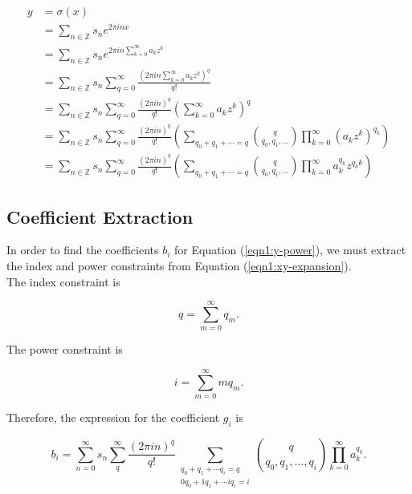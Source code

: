 \documentclass{article}
\begin{document}
    \begin{align}
        y &= \sigma(x) \nonumber \\
          &= \sum_{n\in\mathbb{Z}} s_n e^{2\pi inx} \nonumber \\
          &= \sum_{n\in\mathbb{Z}} s_n e^{2\pi in\sum_{k=0}^{\infty} a_k z^k} \nonumber \\
          &= \sum_{n\in\mathbb{Z}} s_n \sum_{q=0}^{\infty} \frac{\left(2\pi in\sum_{k=0}^{\infty} a_k z^k\right)^q}{q!} \nonumber \\
          &= \sum_{n\in\mathbb{Z}} s_n \sum_{q=0}^{\infty} \frac{(2\pi in)^q}{q!} \left(\sum_{k=0}^{\infty}a_k z^k\right)^q \nonumber \\
          &= \sum_{n\in\mathbb{Z}} s_n \sum_{q=0}^{\infty} \frac{(2\pi in)^q}{q!} \left(\sum_{q_0 + q_1 + \cdots = q} \binom{q}{q_0, q_1, \ldots} \prod_{k=0}^{\infty} \left(a_k z^k\right)^{q_k} \right) \nonumber \\
          &= \sum_{n\in\mathbb{Z}} s_n \sum_{q=0}^{\infty} \frac{(2\pi in)^q}{q!} \left(\sum_{q_0 + q_1 + \cdots = q} \binom{q}{q_0, q_1, \ldots} \prod_{k=0}^{\infty} a_k^{q_k} z^{q_k k} \right)
          \label{eqn1:xy-expansion}
    \end{align}
    
    \subsection{Coefficient Extraction}
    
    In order to find the coefficients $b_i$ for Equation (\ref{eqn1:y-power}), we must extract the index and power constraints from Equation (\ref{eqn1:xy-expansion}).\\
    
    The index constraint is
    
    \begin{equation}
        q = \sum_{m=0}^{\infty} q_m.
    \end{equation}
    
    The power constraint is
    
    \begin{equation}
        i = \sum_{m=0}^{\infty} m q_m.
    \end{equation}
    
    Therefore, the expression for the coefficient $g_i$ is
    
    \begin{equation}
        b_i = \sum_{n=0}^{\infty} s_n \sum_{q}^{\infty} \frac{(2\pi in)^q}{q!} \sum_{\substack{q_0 + q_1 + \cdots q_i = q \\ 0q_0 + 1q_1 + \cdots iq_i = i}} \binom{q}{q_0, q_1, \ldots, q_i} \prod_{k=0}^{\infty} a_k^{q_k}.
    \end{equation}
\end{document}
